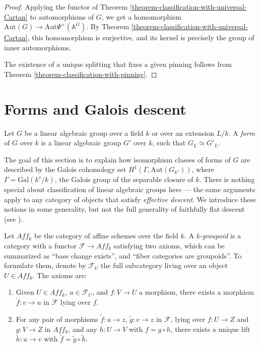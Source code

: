 \begin{proof}
 Applying the functor of Theorem \ref{theorem-classification-with-universal-Cartan} to automorphisms of $G$, we get a homomorphism
 $\text{Aut}(G) \to \text{Aut}\Psi^+(\mathbb A^G)$. By Theorem \ref{theorem-classification-with-universal-Cartan}, this homomorphism is surjective, and its kernel is precisely the group of inner automorphisms. 
 
 The existence of a unique splitting that fixes a given pinning follows from Theorem \ref{theorem-classification-with-pinning}.
\end{proof}



\section{Forms and Galois descent}
\label{section-forms-Galois-descent}

\begin{definition}
 \label{definition-forms}
Let $G$ be a linear algebraic group over a field $k$ or over an extension $L/k$. A {\it form} of $G$ over $k$ is a linear algebraic group $G'$ over $k$, such that $G_L\simeq G'_L$.
\end{definition}


The goal of this section is to explain how isomorphism classes of forms of $G$ are described by the Galois cohomology set $H^1(\Gamma, \text{Aut}(G_{k^s}))$, where $\Gamma = \text{Gal}(k^s/k)$, the Galois group of the separable closure of $k$. There is nothing special about classification of linear algebraic groups here --- the same arguments apply to any category of objects that satisfy \emph{effective descent}. We introduce these notions in some generality, but not the full generality of faithfully flat descent (see \cite[Tag 0238]{stacks-project}).

Let $Aff_k$ be the category of affine schemes over the field $k$. A \emph{k-groupoid} is a category with a functor $\mathcal F\to Aff_k$ satisfying two axioms, which can be summarized as ``base change exists'', and ``fiber categories are groupoids''. To formulate them, denote by $\mathcal F_U$ the full subcategory living over an object $U\in Aff_k$. The axioms are:
\begin{enumerate}
 \item Given $U\in Aff_k$, $u\in \mathcal F_U$, and $f:V\to U$ a morphism, there exists a morphism $\tilde f:v\to u$ in $\mathcal F$ lying over $f$.
 \item For any pair of morphisms $\tilde f: u\to z$, $\tilde g: v\to z$ in $\mathcal F$, lying over $f:U\to Z$ and $g:V\to Z$ in $Aff_k$, and any $h: U\to V$ with $f = g\circ h$, there exists a unique lift $\tilde h: u\to v$ with $\tilde f = \tilde g \circ \tilde h$.
\end{enumerate}

